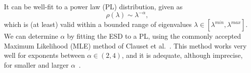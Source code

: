 It can be well-fit to a power law (PL) distribution, given as
\begin{equation}
\rho(\lambda)\sim\lambda^{-\alpha}  ,
\label{eqn:eigenval_pl}
\end{equation}
which is (at least) valid within a bounded range of eigenvalues $\lambda\in[\lambda^{min},\lambda^{max}]$.  
%
We can determine $\alpha$ by fitting the   ESD to a PL, using the commonly accepted Maximum Likelihood (MLE) method of Clauset et al.~\cite{CSN09_powerlaw,ABP14}.
This method works very well for exponents between $\alpha\in(2,4)$, and it is adequate, although imprecise, for smaller and larger $\alpha$~\cite{newman2005_zipf}. 



